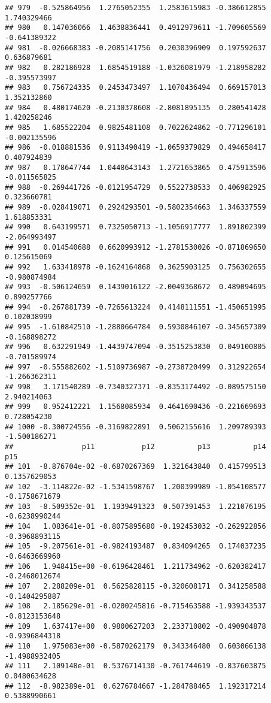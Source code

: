 \documentclass[
]{article}
\begin{document}
\begin{verbatim}
## 979  -0.525864956  1.2765052355  1.2583615983 -0.386612855  1.740329466
## 980   0.147036066  1.4638836441  0.4912979611 -1.709605569 -0.641389322
## 981  -0.026668383 -0.2085141756  0.2030396909  0.197592637  0.636879681
## 982   0.282186928  1.6854519188 -1.0326081979 -1.218958282 -0.395573997
## 983   0.756724335  0.2453473497  1.1070436494  0.669157013  1.352132860
## 984   0.480174620 -0.2130378608 -2.8081895135  0.280541428  1.420258246
## 985   1.685522204  0.9825481108  0.7022624862 -0.771296101 -0.002135596
## 986  -0.018881536  0.9113490419 -1.0659379829  0.494658417  0.407924839
## 987   0.178647744  1.0448643143  1.2721653865  0.475913596 -0.011565825
## 988  -0.269441726 -0.0121954729  0.5522738533  0.406982925  0.323660781
## 989  -0.028419071  0.2924293501 -0.5802354663  1.346337559  1.618853331
## 990   0.643199571  0.7325050713 -1.1056917777  1.891802399 -2.064993497
## 991   0.014540688  0.6620993912 -1.2781530026 -0.871869650  0.125615069
## 992   1.633418978 -0.1624164868  0.3625903125  0.756302655 -0.980874984
## 993  -0.506124659  0.1439016122 -2.0049368672  0.489094695  0.890257766
## 994  -0.267881739 -0.7265613224  0.4148111551 -1.450651995  0.102038999
## 995  -1.610842510 -1.2880664784  0.5930846107 -0.345657309 -0.168898272
## 996   0.632291949 -1.4439747094 -0.3515253830  0.049100805 -0.701589974
## 997  -0.555882602 -1.5109736987 -0.2738720499  0.312922654 -1.266362311
## 998   3.171540289 -0.7340327371 -0.8353174492 -0.089575150  2.940214063
## 999   0.952412221  1.1568085934  0.4641690436 -0.221669693  0.728054230
## 1000 -0.300724556 -0.3169822891  0.5062155616  1.209789393 -1.500186271
##                p11           p12          p13          p14           p15
## 101  -8.876704e-02 -0.6870267369  1.321643840  0.415799513  0.1357629053
## 102  -3.114822e-02 -1.5341598767  1.200399989 -1.054108577 -0.1758671679
## 103  -8.509352e-01  1.1939491323  0.507391453  1.221076195 -0.6238990244
## 104   1.083641e-01 -0.8075895680 -0.192453032 -0.262922856 -0.3968893115
## 105  -9.207561e-01 -0.9824193487  0.834094265  0.174037235 -0.6463669960
## 106   1.948415e+00 -0.6196428461  1.211734962 -0.620382417 -0.2468012674
## 107   2.288209e-01  0.5625828115 -0.320608171  0.341258588 -0.1404295887
## 108   2.185629e-01 -0.0200245816 -0.715463588 -1.939343537 -0.8123153648
## 109   1.637417e+00  0.9800627203  2.233710802 -0.490904878 -0.9396844318
## 110   1.975083e+00 -0.5870262179  0.343346480  0.603066138 -1.4988932405
## 111   2.109148e-01  0.5376714130 -0.761744619 -0.837603875  0.0480634628
## 112  -8.982389e-01  0.6276784667 -1.284788465  1.192317214  0.5388990661

\end{verbatim}
\end{document}
